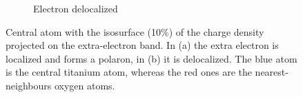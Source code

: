 \begin{figure}[p]
\begin{subfigure}[b]{0.49\textwidth}
        \caption{Electron delocalized}
        \label{fig:delocalized_iso}
    \end{subfigure}
    \caption[Central atom with the isosurface of the charge density projected on the extra-electron band]{Central atom with the isosurface  (10\%) of the charge density projected on the extra-electron band. In (a) the extra electron is localized and forms a polaron, in (b) it is delocalized. The blue atom is the central titanium atom, whereas the red ones are the nearest-neighbours oxygen atoms.}
    \label{fig:isosurfaces_center}
\end{figure}